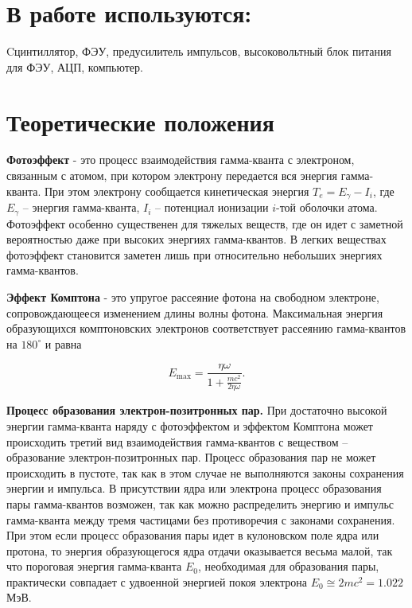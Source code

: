 \documentclass[a4paper,12pt]{article} %
\begin{document}
\medskip

\section{В работе используются:}
Cцинтиллятор, ФЭУ, предусилитель импульсов, высоковольтный блок питания для ФЭУ, АЦП, компьютер.

\medskip

\section{Теоретические положения}
\noindent \textbf{Фотоэффект} - это процесс взаимодействия гамма-кванта с электроном, связанным с атомом, при котором электрону передается вся энергия гамма-кванта. При этом электрону сообщается кинетическая энергия $T_e=E_\gamma-I_i$, где $E_\gamma$ -- энергия гамма-кванта, $I_i$ -- потенциал ионизации $i$-той оболочки атома. Фотоэффект особенно существенен для тяжелых веществ, где он идет с заметной вероятностью даже при высоких энергиях гамма-квантов. В легких веществах фотоэффект становится заметен лишь при относительно небольших энергиях гамма-квантов. 

\medskip 

\noindent \textbf{Эффект Комптона} - это упругое рассеяние фотона на свободном электроне, сопровождающееся изменением длины волны фотона. Максимальная энергия образующихся комптоновских электронов соответствует рассеянию гамма-квантов на $180^\circ$ и равна

\begin{equation}
E_{\max}=\frac{\eta\omega}{1+\frac{mc^2}{2\eta\omega}}.
\end{equation}

\medskip

\noindent \textbf{Процесс образования электрон-позитронных пар.}
При достаточно высокой энергии гамма-кванта наряду с фотоэффектом и эффектом Комптона может происходить третий вид взаимодействия гамма-квантов с веществом -- образование электрон-позитронных пар. Процесс образования пар не может происходить в пустоте, так как в этом случае не выполняются законы сохранения энергии и импульса. В присутствии ядра или электрона процесс образования пары гамма-квантов возможен, так как можно распределить энергию и импульс гамма-кванта между тремя частицами без противоречия с законами сохранения. При этом если процесс образования пары идет в кулоновском поле ядра или протона, то энергия образующегося ядра отдачи оказывается весьма малой, так что пороговая энергия гамма-кванта $E_0$, необходимая для образования пары, практически совпадает с удвоенной энергией покоя электрона $E_0\cong 2mc^2=1.022$ МэВ.
\end{document}
